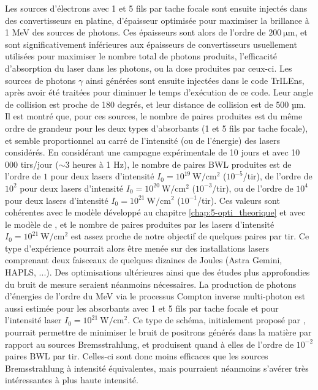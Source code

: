 \begin{refsection}
{\begin{minipage}{\textwidth}
    Les sources d'électrons avec 1 et 5 fils par tache focale sont ensuite injectés dans des convertisseurs en platine, d'épaisseur optimisée pour maximiser la brillance à 1 MeV des sources de photons. Ces épaisseurs sont alors de l'ordre de $200 ~ \si{\um}$, et sont significativement inférieures aux épaisseurs de convertisseurs usuellement utilisées pour maximiser le nombre total de photons produits, l'efficacité d'absorption du laser dans les photons, ou la dose produites par ceux-ci. 
    Les sources de photons $\gamma$ ainsi générées sont ensuite injectées dans le code TrILEns, après avoir été traitées pour diminuer le temps d'exécution de ce code. Leur angle de collision est proche de 180 degrés, et leur distance de collision est de 500 µm. Il est montré que, pour ces sources, le nombre de paires produites est du même ordre de grandeur pour les deux types d'absorbants (1 et 5 fils par tache focale), et semble proportionnel au carré de l'intensité (ou de l'énergie) des lasers considérés. En considérant une campagne expérimentale de 10 jours et avec 10 000 tirs/jour ($\sim 3$ heures à 1 Hz), le nombre de paires BWL produites est de l'ordre de $1$ pour deux lasers d'intensité $I_0=10^{19} ~ \si{\W\per\cm^2}$ ($10^{-5}$/tir), de l'ordre de $10^2$ pour deux lasers d'intensité $I_0=10^{20} ~ \si{\W\per\cm^2}$ ($10^{-3}$/tir), ou de l'ordre de $10^4$ pour deux lasers d'intensité $I_0=10^{21} ~ \si{\W\per\cm^2}$ ($10^{-1}$/tir). Ces valeurs sont cohérentes avec le modèle développé au chapitre \ref{chap:5-opti_theorique} et avec le modèle de \cite{ribeyre_2016}, et le nombre de paires produites par les lasers d'intensité $I_0=10^{21} ~ \si{\W\per\cm^2}$ est assez proche de notre objectif de quelques paires par tir. Ce type d'expérience pourrait alors être menée sur des installations lasers comprenant deux faisceaux de quelques dizaines de Joules (Astra Gemini, HAPLS, ...).
    Des optimisations ultérieures ainsi que des études plus approfondies du bruit de mesure seraient néanmoins nécessaires.
    La production de photons d'énergies de l'ordre du MeV via le processus Compton inverse multi-photon est aussi estimée pour les absorbants avec 1 et 5 fils par tache focale et pour l'intensité laser $I_0=10^{21} ~ \si{\W\per\cm^2}$. Ce type de schéma, initialement proposé par \cite{huang_2018}, pourrait permettre de minimiser le bruit de positrons générés dans la matière par rapport au sources Bremsstrahlung, et produisent quand à elles de l'ordre de $10^{-2}$ paires BWL par tir. Celles-ci sont donc moins efficaces que les sources Bremsstrahlung à intensité équivalentes, mais pourraient néanmoins s'avérer très intéressantes à plus haute intensité. 
    

\end{minipage}}
\end{refsection}
